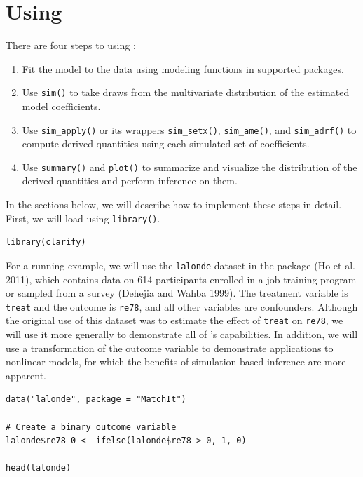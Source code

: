 \hypertarget{using}{%
\section{\texorpdfstring{Using }{Using }}\label{using}}

There are four steps to using :

\begin{enumerate}
\def\labelenumi{\arabic{enumi}.}
\item
  Fit the model to the data using modeling functions in supported packages.
\item
  Use \texttt{sim()} to take draws from the multivariate distribution of the estimated model coefficients.
\item
  Use \texttt{sim\_apply()} or its wrappers \texttt{sim\_setx()}, \texttt{sim\_ame()}, and \texttt{sim\_adrf()} to compute derived quantities using each simulated set of coefficients.
\item
  Use \texttt{summary()} and \texttt{plot()} to summarize and visualize the distribution of the derived quantities and perform inference on them.
\end{enumerate}

In the sections below, we will describe how to implement these steps in detail. First, we will load  using \texttt{library()}.

\begin{verbatim}
library(clarify)
\end{verbatim}

For a running example, we will use the \texttt{lalonde} dataset in the  package (Ho et al. 2011), which contains data on 614 participants enrolled in a job training program or sampled from a survey (Dehejia and Wahba 1999). The treatment variable is \texttt{treat} and the outcome is \texttt{re78}, and all other variables are confounders. Although the original use of this dataset was to estimate the effect of \texttt{treat} on \texttt{re78}, we will use it more generally to demonstrate all of 's capabilities. In addition, we will use a transformation of the outcome variable to demonstrate applications to nonlinear models, for which the benefits of simulation-based inference are more apparent.

\begin{verbatim}
data("lalonde", package = "MatchIt")

# Create a binary outcome variable
lalonde$re78_0 <- ifelse(lalonde$re78 > 0, 1, 0)

head(lalonde)
\end{verbatim}

